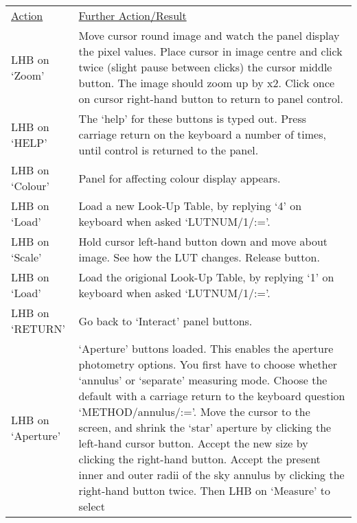 {\begin{enumerate}
      \begin{tabular}{p{1.2in}p{4.3in}}
        \underline{Action} & \underline{Further Action/Result} \\
        LHB on `Zoom'    & Move cursor round image and watch the panel
                           display the pixel values. Place cursor in image
                           centre and click twice (slight pause between
                           clicks) the cursor middle
                           button. The image should zoom up by x2. Click
                           once on cursor right-hand button to return to
                           panel control. \\
        LHB on `HELP'    & The `help' for these buttons is typed out. Press
                           carriage return on the keyboard a number of times,
                           until control is returned to the panel. \\
        LHB on `Colour'  & Panel for affecting colour display appears. \\
        LHB on `Load'    & Load a new Look-Up Table, by replying `4' on
                           keyboard when asked `LUTNUM/1/:='. \\
        LHB on `Scale'   & Hold cursor left-hand button down and move about image.
                           See how the LUT changes. Release button. \\
        LHB on `Load'    & Load the origional Look-Up Table, by replying `1' on
                           keyboard when asked `LUTNUM/1/:='. \\
        LHB on `RETURN'  & Go back to `Interact' panel buttons. \\
        LHB on `Aperture' & `Aperture' buttons loaded. This enables the
                             aperture photometry options. You first have to
                             choose whether `annulus' or `separate'
                             measuring mode. Choose the default with a
                             carriage return to the keyboard question
                             `METHOD/annulus/:='. Move the cursor to the
                             screen, and shrink the `star' aperture by
                             clicking the left-hand cursor button. Accept
                             the new size by clicking the right-hand button.
                             Accept the present inner and outer radii of
                             the sky annulus by clicking the right-hand
                             button twice. Then LHB on `Measure' to select

\end{tabular}
\end{enumerate}}
